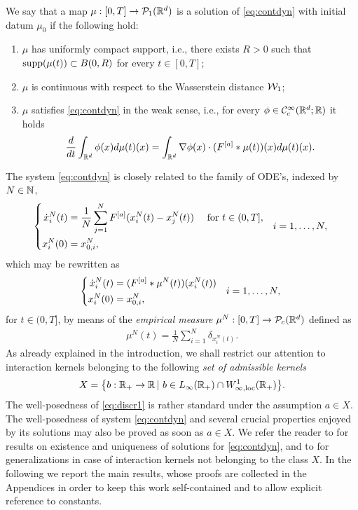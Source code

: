 \begin{definition}
We say that a map $\mu:[0,T]\rightarrow\mathcal{P}_1(\mathbb{R}^d)$ is a solution of \eqref{eq:contdyn} with initial datum $\mu_0$ if the following hold:
\begin{enumerate}
\item $\mu$ has uniformly compact support, i.e., there exists $R > 0$ such that $\operatorname{supp}(\mu(t)) \subset B(0,R)$ for every $t \in [0,T]$;
\item $\mu$ is continuous with respect to the Wasserstein distance $\mathcal{W}_1$;
\item $\mu$ satisfies \eqref{eq:contdyn} in the weak sense, i.e., for every $\phi \in \mathcal{C}^{\infty}_c(\mathbb{R}^d;\mathbb{R})$ it holds
\begin{align*}
\frac{d}{dt} \int_{\mathbb{R}^d} \phi(x) d\mu(t)(x) = \int_{\mathbb{R}^d} \nabla \phi(x) \cdot (F^{[a]}*\mu(t))(x) d\mu(t)(x).
\end{align*}
\end{enumerate}
\end{definition}

The system \eqref{eq:contdyn} is closely related to the family of ODE's, indexed by $N \in \mathbb{N}$,
\begin{align}\label{eq:discrdyn}
\left\{\begin{aligned}
\dot{x}^N_i(t) &= \frac{1}{N}\sum^N_{j = 1}F^{[a]}(x^N_i(t) - x^N_j(t)) \quad \text{ for } t \in (0,T],\\
x_i^N(0) &= x^N_{0,i},
\end{aligned} \quad i = 1, \ldots, N, \right.
\end{align}
which may be rewritten as 
\begin{align}\label{eq:discr1}
\left\{\begin{aligned}
\dot{x}^N_i(t) &= (F^{[a]}*\mu^N(t))(x^N_i(t)) \\
x^N_i(0) &= x^N_{0,i},
\end{aligned} \quad i = 1, \ldots, N, \right.
\end{align}
for $t\in(0,T]$, by means of the \textit{empirical measure} $\mu^N:[0,T]\rightarrow\mathcal{P}_c(\mathbb{R}^d)$ defined as
\begin{align}\label{eq:empmeas}
\mu^N(t) = \frac{1}{N}\sum^N_{i = 1} \delta_ {x^N_i(t)}.
\end{align}
As already explained in the introduction, we shall restrict our attention to interaction kernels belonging to the following \textit{set of admissible kernels}
\begin{align*}
	X=\bigl\{b:\mathbb{R}_+\rightarrow\mathbb{R}\,|\ b \in L_{\infty}(\mathbb{R}_+) \cap W^{1}_{\infty,\textup{loc}}(\mathbb{R}_+) \bigr \}.
\end{align*}
The well-posedness of \eqref{eq:discr1} is rather standard under the assumption $a \in X$. The well-posedness of system \eqref{eq:contdyn} and several crucial properties enjoyed by its solutions may also be proved as soon as $a \in X$.
We refer the reader to \cite{AGS} for results on existence and uniqueness of solutions for \eqref{eq:contdyn}, and to  \cite{13-Carrillo-Choi-Hauray-MFL} for generalizations in case of interaction kernels not belonging to the class $X$. In the following we report the main results, whose proofs are collected in the Appendices in order to keep this work self-contained and to allow explicit reference to constants.
 

